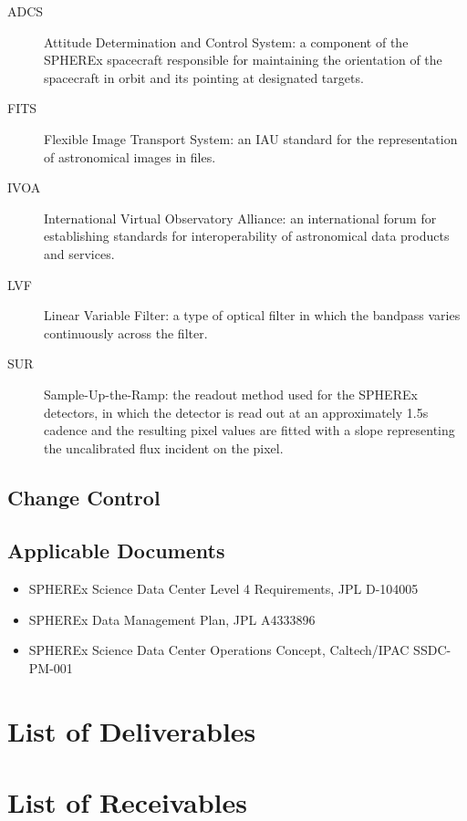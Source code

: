 \documentclass[IF]{spherex}
\begin{document}
\begin{description}
  \item[ADCS]  Attitude Determination and Control System: a component of
    the SPHEREx spacecraft responsible for maintaining the orientation of
    the spacecraft in orbit and its pointing at designated targets.
  \item[FITS]  Flexible Image Transport System: an IAU standard for the
    representation of astronomical images in files.
  \item[IVOA]  International Virtual Observatory Alliance: an international
    forum for establishing standards for interoperability of astronomical
    data products and services.
  \item[LVF]   Linear Variable Filter: a type of optical filter in which the
    bandpass varies continuously across the filter.
  \item[SUR]   Sample-Up-the-Ramp: the readout method used for the SPHEREx
    detectors, in which the detector is read out at an approximately 1.5s
    cadence and the resulting pixel values are fitted with a slope
    representing the uncalibrated flux incident on the pixel.
\end{description}

\subsection{Change Control}


\subsection{Applicable Documents}


\begin{itemize}
  \item SPHEREx Science Data Center Level 4 Requirements, JPL D-104005
  \item SPHEREx Data Management Plan, JPL A4333896
  \item SPHEREx Science Data Center Operations Concept, Caltech/IPAC SSDC-PM-001
\end{itemize}


\section{List of Deliverables}


\section{List of Receivables}




% 
\end{document}
